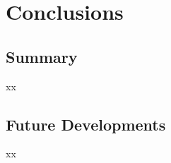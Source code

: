 \chapter{Conclusions} \label{chap6}

\section{Summary} \label{6summary}
xx


\section{Future Developments} \label{6futuredevelopments}

xx

